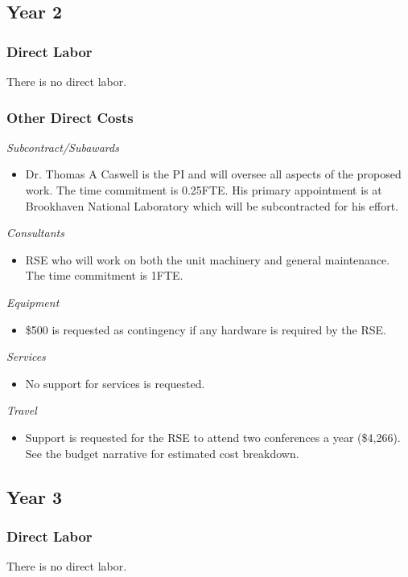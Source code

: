 \documentclass[12pt]{article}
\numberwithin{page}{section}
\begin{document}
\subsection{Year 2}
\subsubsection{Direct Labor}
There is no direct labor.
\subsubsection{Other Direct Costs}
\textit{Subcontract/Subawards}
\begin{itemize}
\item Dr. Thomas A Caswell is the PI and will oversee all aspects of the
  proposed work.  The time commitment is 0.25FTE.  His primary
  appointment is at Brookhaven National Laboratory which will be
  subcontracted for his effort.
\end{itemize}
\textit{Consultants}
\begin{itemize}
\item RSE who will work on both the unit machinery and general
  maintenance.  The time commitment is 1FTE.
\end{itemize}
\textit{Equipment}
\begin{itemize}
\item \$500 is requested as contingency if any hardware is required by the RSE.
\end{itemize}
\textit{Services}
\begin{itemize}
\item No support for services is requested.
\end{itemize}
\textit{Travel}
\begin{itemize}
\item Support is requested for the RSE to attend two conferences a
  year (\$4,266).  See the budget narrative for estimated cost
  breakdown.
\end{itemize}
\subsection{Year 3}
\subsubsection{Direct Labor}
There is no direct labor.
\end{document}
